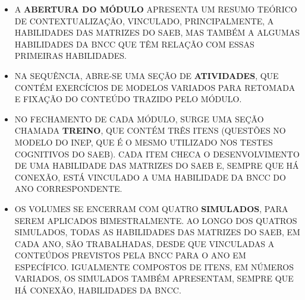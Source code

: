 \begin{itemize}
\item
  A \textbf{ABERTURA DO MÓDULO} APRESENTA UM RESUMO TEÓRICO DE
  CONTEXTUALIZAÇÃO, VINCULADO, PRINCIPALMENTE, A HABILIDADES DAS
  MATRIZES DO SAEB, MAS TAMBÉM A ALGUMAS HABILIDADES DA BNCC QUE TÊM
  RELAÇÃO COM ESSAS PRIMEIRAS HABILIDADES.
\item
  NA SEQUÊNCIA, ABRE-SE UMA SEÇÃO DE \textbf{ATIVIDADES}, QUE CONTÉM
  EXERCÍCIOS DE MODELOS VARIADOS PARA RETOMADA E FIXAÇÃO
  DO CONTEÚDO TRAZIDO PELO MÓDULO.
\item
  NO FECHAMENTO DE CADA MÓDULO, SURGE UMA SEÇÃO CHAMADA \textbf{TREINO},
  QUE CONTÉM TRÊS ITENS (QUESTÕES NO MODELO DO INEP, QUE É O MESMO
  UTILIZADO NOS TESTES COGNITIVOS DO SAEB). CADA ITEM CHECA O
  DESENVOLVIMENTO DE UMA HABILIDADE DAS MATRIZES DO SAEB E, SEMPRE QUE
  HÁ CONEXÃO, ESTÁ VINCULADO A UMA HABILIDADE DA BNCC DO ANO
  CORRESPONDENTE.
\item
  OS VOLUMES SE ENCERRAM COM QUATRO \textbf{SIMULADOS}, PARA SEREM
  APLICADOS BIMESTRALMENTE. AO LONGO DOS QUATROS SIMULADOS, TODAS AS
  HABILIDADES DAS MATRIZES DO SAEB, EM CADA ANO, SÃO TRABALHADAS, DESDE
  QUE VINCULADAS A CONTEÚDOS PREVISTOS PELA BNCC PARA O ANO EM
  ESPECÍFICO. IGUALMENTE COMPOSTOS DE ITENS, EM NÚMEROS VARIADOS, OS
  SIMULADOS TAMBÉM APRESENTAM, SEMPRE QUE HÁ CONEXÃO, HABILIDADES DA
  BNCC.
\end{itemize}
